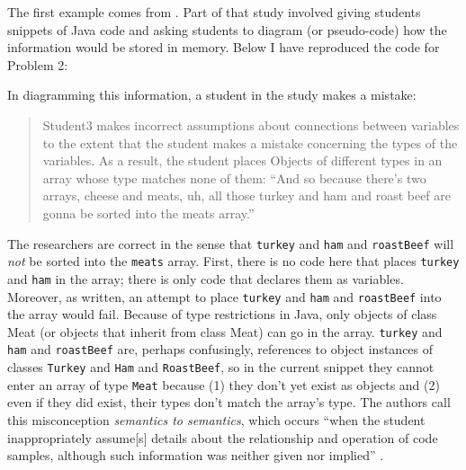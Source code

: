 The first example comes from \cite{kaczmarczyk_identifying_2010}. Part of that
study involved giving students snippets of Java code and asking students
to diagram (or pseudo-code) how the information would be stored in
memory. Below I have reproduced the code for Problem 2:

\hypertarget{sandiwches-code}{\label{sandwiches-code}}
\begin{Shaded}
\begin{Highlighting}[numbers=left,,]
 \NormalTok{Cheese[}\NormalTok{];}
 \NormalTok{Meat[}\NormalTok{];}
 \NormalTok{;}
 \NormalTok{;}
 \NormalTok{();}
 
 
\end{Highlighting}
\end{Shaded}

In diagramming this information, a student in the study makes a mistake:

\begin{quote}
  Student3 makes incorrect assumptions about connections between variables
  to the extent that the student makes a mistake concerning the types of
  the variables. As a result, the student places Objects of different
  types in an array whose type matches none of them: ``And so because
  there's two arrays, cheese and meats, uh, all those turkey and ham and
  roast beef are gonna be sorted into the meats array.'' \cite{kaczmarczyk_identifying_2010}
\end{quote}

The researchers are correct in the sense that \texttt{turkey} and
\texttt{ham} and \texttt{roastBeef} will \emph{not} be sorted into the
\texttt{meats} array. First, there is no code here that places
\texttt{turkey} and \texttt{ham} in the array; there is only code that
declares them as variables. Moreover, as written, an attempt to place
\texttt{turkey} and \texttt{ham} and \texttt{roastBeef} into the array
would fail. Because of type restrictions in Java, only objects of class
Meat (or objects that inherit from class Meat) can go in the array.
\texttt{turkey} and \texttt{ham} and \texttt{roastBeef} are, perhaps
confusingly, references to object instances of classes \texttt{Turkey}
and \texttt{Ham} and \texttt{RoastBeef}, so in the current snippet they
cannot enter an array of type \texttt{Meat} because (1) they don't yet
exist as objects and (2) even if they did exist, their types don't match
the array's type. The authors call this misconception \emph{semantics to
semantics}, which occurs ``when the student inappropriately
assume{[}s{]} details about the relationship and operation of code
samples, although such information was neither given nor implied''
\cite{kaczmarczyk_identifying_2010}.

